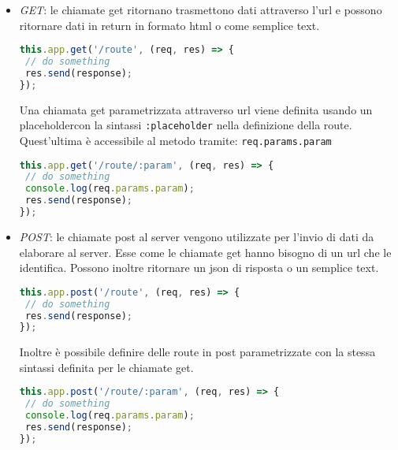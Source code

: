 \begin{itemize}


 \item \textit{GET}: le chiamate get ritornano trasmettono dati attraverso l'url e possono ritornare dati in return in formato html o come semplice text.
\begin{lstlisting}[language=JavaScript]
this.app.get('/route', (req, res) => {
 // do something
 res.send(response);
});
\end{lstlisting} 
Una chiamata get parametrizzata attraverso url viene definita usando un placeholder\glossario  con la sintassi \texttt{:placeholder} nella definizione della route. Quest'ultima è accessibile al metodo tramite: \texttt{req.params.param}
\begin{lstlisting}[language=JavaScript]
this.app.get('/route/:param', (req, res) => {
 // do something
 console.log(req.params.param);
 res.send(response);
});
\end{lstlisting}
\item \textit{POST}: le chiamate post al server vengono utilizzate per l'invio di dati da elaborare al server. Esse come le chiamate get hanno bisogno di un url che le identifica. Possono inoltre ritornare un json di risposta o un semplice text. 
\begin{lstlisting}[language=JavaScript]
this.app.post('/route', (req, res) => {
 // do something
 res.send(response);
});
\end{lstlisting} 
Inoltre è possibile definire delle route in post parametrizzate con la stessa sintassi definita per le chiamate get. 
\begin{lstlisting}[language=JavaScript]
this.app.post('/route/:param', (req, res) => {
 // do something
 console.log(req.params.param);
 res.send(response);
});
\end{lstlisting}


\end{itemize}
